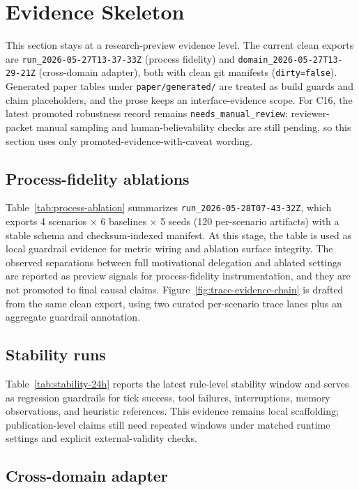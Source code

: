 \section{Evidence Skeleton}

This section stays at a research-preview evidence level. The current clean exports are \texttt{run\_2026-05-27T13-37-33Z} (process fidelity) and \texttt{domain\_2026-05-27T13-29-21Z} (cross-domain adapter), both with clean git manifests (\texttt{dirty=false}). Generated paper tables under \texttt{paper/generated/} are treated as build guards and claim placeholders, and the prose keeps an interface-evidence scope.
For C16, the latest promoted robustness record remains \texttt{needs\_manual\_review}; reviewer-packet manual sampling and human-believability checks are still pending, so this section uses only promoted-evidence-with-caveat wording.

\subsection{Process-fidelity ablations}

Table~\ref{tab:process-ablation} summarizes \texttt{run\_2026-05-28T07-43-32Z}, which exports 4 scenarios $\times$ 6 baselines $\times$ 5 seeds (120 per-scenario artifacts) with a stable schema and checksum-indexed manifest. At this stage, the table is used as local guardrail evidence for metric wiring and ablation surface integrity. The observed separations between full motivational delegation and ablated settings are reported as preview signals for process-fidelity instrumentation, and they are not promoted to final causal claims. Figure~\ref{fig:trace-evidence-chain} is drafted from the same clean export, using two curated per-scenario trace lanes plus an aggregate guardrail annotation.

\subsection{Stability runs}

Table~\ref{tab:stability-24h} reports the latest rule-level stability window and serves as regression guardrails for tick success, tool failures, interruptions, memory observations, and heuristic references. This evidence remains local scaffolding; publication-level claims still need repeated windows under matched runtime settings and explicit external-validity checks.

\subsection{Cross-domain adapter}

